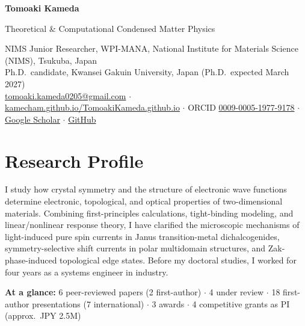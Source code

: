 \documentclass[10pt,a4paper]{article}
\begin{document}
{\sffamily\fontsize{22}{26}\selectfont\bfseries Tomoaki Kameda}\par\vspace{3pt}
{\sffamily\color{muted} Theoretical \& Computational Condensed Matter Physics}\par\vspace{5pt}
{\small
NIMS Junior Researcher, WPI-MANA, National Institute for Materials Science (NIMS), Tsukuba, Japan\\
Ph.D.\ candidate, Kwansei Gakuin University, Japan (Ph.D.\ expected March 2027)\\[2pt]
\href{mailto:tomoaki.kameda0205@gmail.com}{tomoaki.kameda0205@gmail.com} \;$\cdot$\;
\href{https://kamecham.github.io/TomoakiKameda.github.io/}{kamecham.github.io/TomoakiKameda.github.io} \;$\cdot$\;
ORCID \href{https://orcid.org/0009-0005-1977-9178}{0009-0005-1977-9178} \;$\cdot$\;
\href{https://scholar.google.com/citations?user=HvIXeq4AAAAJ}{Google Scholar} \;$\cdot$\;
\href{https://github.com/kamecham}{GitHub}\par}

\section{Research Profile}
I study how crystal symmetry and the structure of electronic wave functions determine electronic, topological, and optical properties of two-dimensional materials. Combining first-principles calculations, tight-binding modeling, and linear/nonlinear response theory, I have clarified the microscopic mechanisms of light-induced pure spin currents in Janus transition-metal dichalcogenides, symmetry-selective shift currents in polar multidomain structures, and Zak-phase-induced topological edge states. Before my doctoral studies, I worked for four years as a systems engineer in industry.

\smallskip
{\small\textbf{At a glance:} 6 peer-reviewed papers (2 first-author) $\cdot$ 4 under review $\cdot$ 18 first-author presentations (7 international) $\cdot$ 3 awards $\cdot$ 4 competitive grants as PI (approx.\ JPY 2.5M)}
\end{document}
